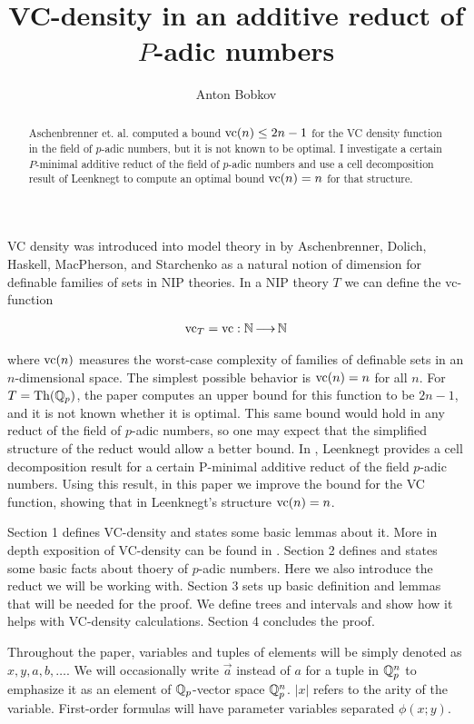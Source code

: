 \documentclass{amsart}
\title{VC-density in an additive reduct of $P$-adic numbers}
\author{Anton Bobkov}
\begin{document}
\begin{abstract}
  Aschenbrenner et. al. computed a bound $\operatorname{vc}(n) \leq 2n - 1$ for the VC density function in the field of $p$-adic numbers,
  but it is not known to be optimal.
  I investigate a certain $P$-minimal additive reduct of the field of $p$-adic numbers and
  use a cell decomposition result of Leenknegt to compute an optimal bound $\operatorname{vc}(n) = n$ for that structure.
\end{abstract}


\maketitle

VC density was introduced into model theory in \cite{density} by Aschenbrenner, Dolich, Haskell, MacPherson, and Starchenko
as a natural notion of dimension for definable families of sets in NIP theories.
In a NIP theory $T$ we can define the vc-function

\begin{align*}
  \operatorname{vc}_T = \operatorname{vc} : \mathbb{N} \operatorname{\longrightarrow} \mathbb{N}
\end{align*}

where $\operatorname{vc}(n)$ measures the worst-case complexity of families of definable sets in an $n$-dimensional space.
The simplest possible behavior is $\operatorname{vc}(n) = n$ for all $n$.
For $T = \operatorname{Th}(\mathbb{Q}_p)$, the paper \cite{density} computes an upper bound for this function to be $2n-1$, and it is not known whether it is optimal.
This same bound would hold in any reduct of the field of $p$-adic numbers, so one may expect that the simplified structure of the reduct would allow a better bound.
In \cite{reduct}, Leenknegt provides a cell decomposition result for a certain P-minimal additive reduct of the field $p$-adic numbers.
Using this result, in this paper we improve the bound for the VC function, showing that in Leenknegt's structure $\operatorname{vc}(n) = n$.

Section 1 defines VC-density and states some basic lemmas about it.
More in depth exposition of VC-density can be found in \cite{density}.
Section 2 defines and states some basic facts about thoery of $p$-adic numbers.
Here we also introduce the reduct we will be working with.
Section 3 sets up basic definition and lemmas that will be needed for the proof.
We define trees and intervals and show how it helps with VC-density calculations.
Section 4 concludes the proof.

Throughout the paper, variables and tuples of elements will be simply denoted as $x, y, a, b, \ldots$.
We will occasionally write $\vec a$ instead of $a$ for a tuple in $\mathbb{Q}_p^n$ to emphasize it as an element of $\mathbb{Q}_p$-vector space $\mathbb{Q}_p^n$.
$|x|$ refers to the arity of the variable.
First-order formulas will have parameter variables separated $\phi(x; y)$.
\end{document}
